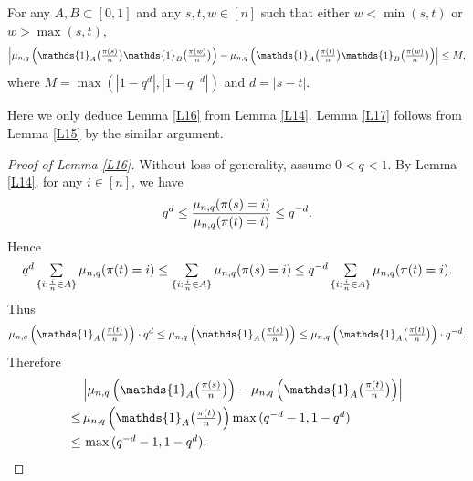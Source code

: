 \begin{lemma}\label{L17}
For any $A, B \subset [0, 1]$ and any $s, t, w \in [n]$ such that either $w < \min{(s, t)}$ or $w > \max{(s, t)}$,
\[
\textstyle\left|\m \left( \mathds{1}_A \big(\frac{\pi(s)}{n} \big)\mathds{1}_B \big(\frac{\pi(w)}{n} \big) \right) -
     \m \left( \mathds{1}_A \big(\frac{\pi(t)}{n} \big) \mathds{1}_B \big(\frac{\pi(w)}{n} \big) \right) \right| \le M,
\]
where $M = \max{(|1-q^d|, |1 - q^{-d}|)}$ and $d = |s-t|$.
\end{lemma}
Here we only deduce Lemma \ref{L16} from Lemma \ref{L14}. Lemma \ref{L17} follows from Lemma \ref{L15} by the similar argument.
\begin{proof}[Proof of Lemma \ref{L16}]
Without loss of generality, assume $0 < q < 1$. By Lemma \ref{L14}, for any $i \in [n]$, we have
\[
q^d \le \frac{\mu_{n, q}(\pi(s)=i)}{\mu_{n, q}(\pi(t)=i)}\le q^{-d}.
\]
Hence
\[
\textstyle q^d \sum\limits_{\{i:\frac{i}{n} \in A\}} \mu_{n, q}(\pi(t)=i) \le \sum\limits_{\{i:\frac{i}{n} \in A\}} \mu_{n, q}(\pi(s)=i)\le q^{-d}\sum\limits_{\{i:\frac{i}{n} \in A\}} \mu_{n, q}(\pi(t)=i).
\]
Thus
\[
\textstyle\m \left( \mathds{1}_A \big(\frac{\pi(t)}{n} \big) \right) \cdot q^d \le \m \left( \mathds{1}_A \big(\frac{\pi(s)}{n} \big) \right)
  \le \m \left( \mathds{1}_A \big(\frac{\pi(t)}{n} \big) \right) \cdot q^{-d}.
\]
Therefore
\begin{align*}
   &\textstyle\left|\m \left( \mathds{1}_A \big(\frac{\pi(s)}{n} \big) \right) -
     \m \left( \mathds{1}_A \big(\frac{\pi(t)}{n} \big) \right) \right|\\
 \le&\, \textstyle\m \left( \mathds{1}_A \big(\frac{\pi(t)}{n} \big) \right)\max{(q^{-d}-1, 1 - q^d)}\\
 \le&\, \textstyle\max{(q^{-d}-1, 1 - q^d)}.
\end{align*}
\end{proof}




